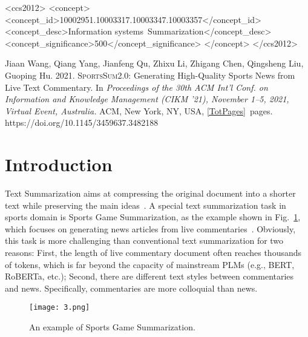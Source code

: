 \begin{CCSXML}
<ccs2012>
<concept>
<concept_id>10002951.10003317.10003347.10003357</concept_id>
<concept_desc>Information systems~Summarization</concept_desc>
<concept_significance>500</concept_significance>
</concept>
</ccs2012>
\end{CCSXML}


\maketitle

{%
  \medskip\small{}\par\nobreak
  \noindent\bgroup\def\\{\unskip{}, \ignorespaces}{Jiaan Wang, Qiang Yang, Jianfeng Qu, Zhixu Li, Zhigang Chen, Qingsheng Liu, Guoping Hu}\egroup. 2021. \textsc{SportsSum2.0}: Generating High-Quality Sports News from Live Text Commentary. In \textit{Proceedings of the 30th ACM Int'l Conf. on Information and Knowledge Management (CIKM '21), November 1--5, 2021, Virtual Event, Australia}\textit{.} ACM, New York, NY, USA, \ref{TotPages}~pages. https://doi.org/10.1145/3459637.3482188
  }

\section{Introduction}
Text Summarization aims at compressing the original document into a shorter text while preserving the main ideas~\cite{rush-etal-2015-neural,chopra-etal-2016-abstractive,Nallapati2016AbstractiveTS,See2017GetTT,chen-bansal-2018-fast}.
A special text summarization task in sports domain is Sports Game Summarization, as the example shown in Fig.~\ref{example}, which focuses on generating news articles from live commentaries~\cite{zhang-etal-2016-towards}. Obviously, this task is more challenging than conventional text summarization for two reasons: First, the length of live commentary document often reaches thousands of tokens, which is far beyond the capacity of mainstream PLMs (e.g., BERT, RoBERTa, etc.); Second, there are different text styles between commentaries and news. Specifically, commentaries are more colloquial than news. 

\begin{figure}[t]
\centerline{\texttt{[image: 3.png]}}
\caption{An example of Sports Game Summarization.}
\label{example}
\end{figure} 

